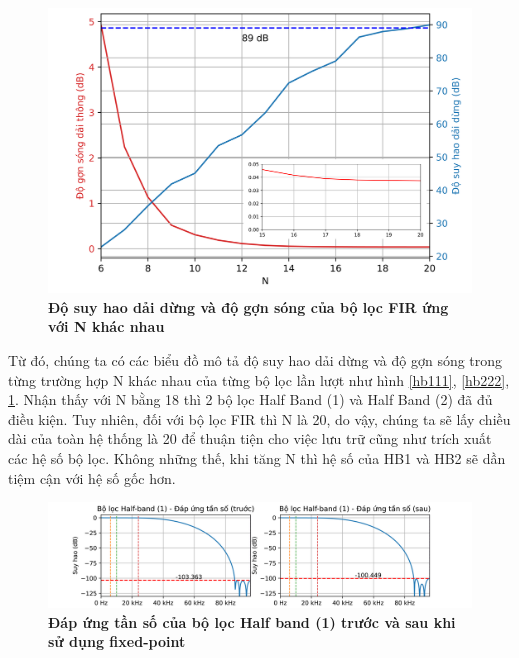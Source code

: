 \begin{figure}[H]
    \centering
    \includegraphics[width=11.5cm]{Images/Chuong4/plot/fir.png}
    \caption[Độ suy hao dải dừng và độ gợn sóng của bộ lọc FIR ứng với N khác nhau]{\bfseries \fontsize{12pt}{0pt}\selectfont Độ suy hao dải dừng và độ gợn sóng của bộ lọc FIR ứng với N khác nhau}
    \label{firrr}
\end{figure}
Từ đó, chúng ta có các biểu đồ mô tả độ suy hao dải dừng và độ gợn sóng trong từng trường hợp N khác nhau của từng bộ lọc lần lượt như hình \ref{hb111}, \ref{hb222}, \ref{firrr}. Nhận thấy với N bằng 18 thì 2 bộ lọc Half Band (1) và Half Band (2) đã đủ điều kiện. Tuy nhiên, đối với bộ lọc FIR thì N là 20, do vậy, chúng ta sẽ lấy chiều dài của toàn hệ thống là 20 để thuận tiện cho việc lưu trữ cũng như trích xuất các hệ số bộ lọc. Không những thế, khi tăng N thì hệ số của HB1 và HB2 sẽ dần tiệm cận với hệ số gốc hơn.
\begin{figure}[H]
    \centering
    \includegraphics[width=17.5cm]{Images/Chuong4/hb1.png}
    \caption[Đáp ứng tần số của bộ lọc Half band (1) trước và sau khi sử dụng fixed-point]{\bfseries \fontsize{12pt}{0pt}\selectfont Đáp ứng tần số của bộ lọc Half band (1) trước và sau khi sử dụng fixed-point}
    \label{hb1_d}
\end{figure}

